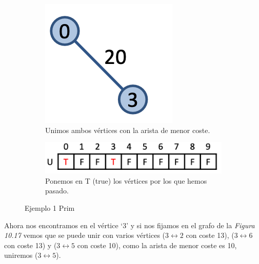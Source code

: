 \begin{figure}[h]
  \begin{minipage}{0.4\textwidth}
    \centering
    \begin{subfigure}{\textwidth}
      \centering
      \includegraphics[width=.5\textwidth]{assets/prim2.png}
      \caption{Unimos ambos vértices con la arista de menor coste.}
    \end{subfigure}
  \end{minipage}
  \hfill
  \begin{minipage}{0.5\textwidth}
    \centering
    \begin{subfigure}{\textwidth}
      \centering
      \includegraphics[width=\textwidth]{assets/prim3.png}
      \caption{Ponemos en T (true) los vértices por los que hemos pasado.}
    \end{subfigure}
  \end{minipage}
  \caption{Ejemplo 1 Prim}
\end{figure}

Ahora nos encontramos en el vértice `3' y si nos fijamos en el grafo de la \textit{Figura 10.17} vemos que se puede unir con varios vértices (\(3 \leftrightarrow 2\) con coste 13), (\(3 \leftrightarrow 6\) con coste 13) y (\(3 \leftrightarrow 5\) con coste 10), como la arista de menor coste es 10, uniremos (\(3 \leftrightarrow 5\)).

